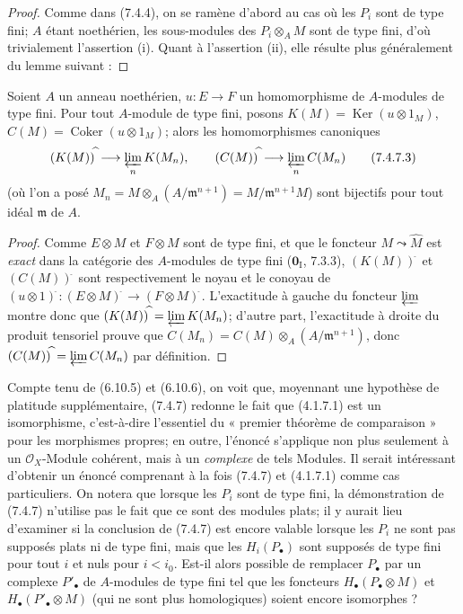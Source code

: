 \begin{proof}
Comme dans (7.4.4), on se ramène d'abord au cas où les $P_i$ sont de type fini;
$A$ étant noethérien, les sous-modules des $P_i\otimes_A M$ sont de type fini,
d'où trivialement l'assertion (i). Quant à l'assertion (ii), elle résulte plus
généralement du lemme suivant :
\end{proof}

\begin{lemma}[7.4.7.2]
Soient $A$ un anneau noethérien, $u:E\to F$ un homomorphisme de $A$-modules de
type fini. Pour tout $A$-module de type fini, posons
$K(M)=\operatorname{Ker}(u\otimes1_M)$,
$C(M)=\operatorname{Coker}(u\otimes1_M)$;
alors les homomorphismes canoniques
\[
  (K(M))^{\widehat{\,}}\longrightarrow\varprojlim_n K(M_n),
  \qquad
  (C(M))^{\widehat{\,}}\longrightarrow\varprojlim_n C(M_n)
  \tag{7.4.7.3}\label{III.7.4.7.3.fr}
\]
(où l'on a posé
$M_n=M\otimes_A(A/\mathfrak m^{n+1})=M/\mathfrak m^{n+1}M$) sont bijectifs
pour tout idéal $\mathfrak m$ de $A$.
\end{lemma}

\begin{proof}
Comme $E\otimes M$ et $F\otimes M$ sont de type fini, et que le foncteur
$M\leadsto\widehat M$ est \emph{exact} dans la catégorie des $A$-modules de type fini
($\mathbf{0}_{\mathrm I}$, 7.3.3), $(K(M))^{\widehat{\,}}$ et $(C(M))^{\widehat{\,}}$ sont
respectivement le noyau et le conoyau de
$(u\otimes1)^{\widehat{\,}}:(E\otimes M)^{\widehat{\,}}\longrightarrow(F\otimes M)^{\widehat{\,}}$.
L'exactitude à gauche du foncteur $\varprojlim$ montre donc que
$(K(M))^{\widehat{\,}}=\varprojlim K(M_n)$; d'autre part, l'exactitude à droite du
produit tensoriel prouve que
$C(M_n)=C(M)\otimes_A(A/\mathfrak m^{n+1})$, donc
$(C(M))^{\widehat{\,}}=\varprojlim C(M_n)$ par définition.
\end{proof}

\begin{remark}[7.4.8]
Compte tenu de (6.10.5) et (6.10.6), on voit que, moyennant une hypothèse de
platitude supplémentaire, (7.4.7) redonne le fait que (4.1.7.1) est un
isomorphisme, c'est-à-dire l'essentiel du « premier théorème de comparaison »
pour les morphismes propres; en outre, l'énoncé s'applique non plus seulement
à un $\mathscr O_X$-Module cohérent, mais à un \emph{complexe} de tels Modules. Il
serait intéressant d'obtenir un énoncé comprenant à la fois (7.4.7) et
(4.1.7.1) comme cas particuliers. On notera que lorsque les $P_i$ sont de type
fini, la démonstration de (7.4.7) n'utilise pas le fait que ce sont des modules
plats; il y aurait lieu d'examiner si la conclusion de (7.4.7) est encore
valable lorsque les $P_i$ ne sont pas supposés plats ni de type fini, mais que
les $H_i(P_\bullet)$ sont supposés de type fini pour tout $i$ et nuls pour
$i<i_0$. Est-il alors possible de remplacer $P_\bullet$ par un complexe
$P'_\bullet$ de $A$-modules de type fini tel que les foncteurs
$H_\bullet(P_\bullet\otimes M)$ et $H_\bullet(P'_\bullet\otimes M)$ (qui ne
sont plus homologiques) soient encore isomorphes ?
\end{remark}


